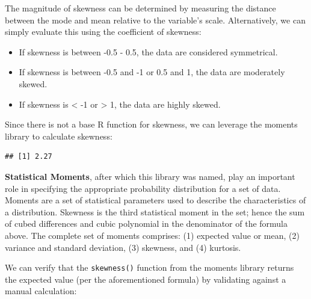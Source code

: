 \documentclass[
]{book}
\newenvironment{Shaded}{\begin{snugshade}}{\end{snugshade}}
\newcommand{\CommentTok}[1]{\textcolor[rgb]{0.56,0.35,0.01}{\textit{#1}}}
\newcommand{\DecValTok}[1]{\textcolor[rgb]{0.00,0.00,0.81}{#1}}
\newcommand{\FunctionTok}[1]{\textcolor[rgb]{0.00,0.00,0.00}{#1}}
\newcommand{\NormalTok}[1]{#1}
\newcommand{\SpecialCharTok}[1]{\textcolor[rgb]{0.00,0.00,0.00}{#1}}
\providecommand{\tightlist}{%
  \setlength{\itemsep}{0pt}\setlength{\parskip}{0pt}}
\begin{document}
The magnitude of skewness can be determined by measuring the distance between the mode and mean relative to the variable's scale. Alternatively, we can simply evaluate this using the coefficient of skewness:

\begin{itemize}
\tightlist
\item
  If skewness is between -0.5 - 0.5, the data are considered symmetrical.
\item
  If skewness is between -0.5 and -1 or 0.5 and 1, the data are moderately skewed.
\item
  If skewness is \textless{} -1 or \textgreater{} 1, the data are highly skewed.
\end{itemize}

Since there is not a base R function for skewness, we can leverage the moments library to calculate skewness:

\begin{Shaded}
\end{Shaded}

\begin{verbatim}
## [1] 2.27
\end{verbatim}

\textbf{Statistical Moments}, after which this library was named, play an important role in specifying the appropriate probability distribution for a set of data. Moments are a set of statistical parameters used to describe the characteristics of a distribution. Skewness is the third statistical moment in the set; hence the sum of cubed differences and cubic polynomial in the denominator of the formula above. The complete set of moments comprises: (1) expected value or mean, (2) variance and standard deviation, (3) skewness, and (4) kurtosis.

We can verify that the \texttt{skewness()} function from the moments library returns the expected value (per the aforementioned formula) by validating against a manual calculation:
\end{document}
